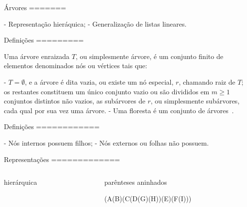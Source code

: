 %

Árvores
=======

- Representação hieráquica;
- Generalização de listas lineares.

Definições
=========

Uma \alert{árvore enraizada $T$}, ou simplesmente \alert{árvore}, 
é um conjunto finito de elementos denominados \alert{nós} ou
\alert{vértices} tais que:

- $T=\emptyset$, e a árvore é dita vazia, ou
 existe um nó especial, $r$, chamando \alert{raiz} de $T$; os
restantes constituem um único conjunto vazio ou são divididos em
$m\geq 1$ conjuntos distintos não vazios, as \alert{subárvores} de
$r$, ou simplesmente \alert{subárvores}, cada qual por sua vez uma
árvore.
- Uma \alert{floresta} é um conjunto de árvores~\cite{szwarcfiter}.


Definições
============

- \alert{Nós internos} possuem filhos;
- \alert{Nós externos} ou \alert{folhas} não possuem.




Representações
=============

\begin{columns}
\begin{column}{.5\textwidth}
hierárquica\\
\bigskip

\end{column}
\begin{column}{.5\textwidth}
parênteses aninhados\\

\begin{center}
(A(B)(C(D(G)(H))(E)(F(I)))
\end{center}
\end{column}
\end{columns}
